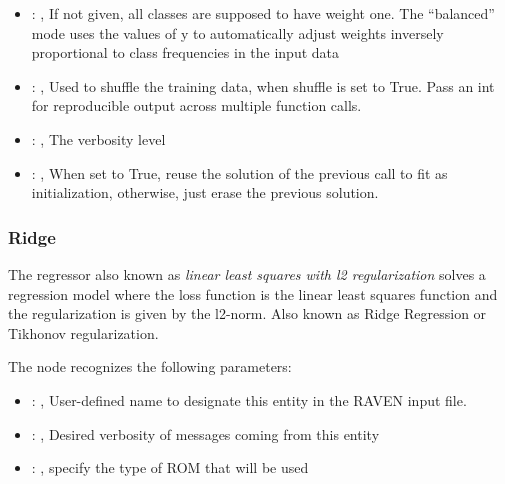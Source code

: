 \begin{itemize}
    \item {}: \xmlDesc{[balanced]}, 
      If not given, all classes are supposed to have weight one.
      The “balanced” mode uses the values of y to automatically adjust weights
      inversely proportional to class frequencies in the input data

    \item {}: , 
      Used to shuffle the training data, when shuffle is set to
      True. Pass an int for reproducible output across multiple function calls.

    \item {}: , 
      The verbosity level

    \item {}: , 
      When set to True, reuse the solution of the previous call
      to fit as initialization, otherwise, just erase the previous solution.
  \end{itemize}


\subsubsection{Ridge}
  The  regressor also known as                              \textit{linear least
  squares with l2 regularization} solves a regression                              model where the
  loss function is the linear least squares function and the
  regularization is given by the l2-norm.                              Also known as Ridge
  Regression or Tikhonov regularization.

  The  node recognizes the following parameters:
    \begin{itemize}
      \item {}: , 
        User-defined name to designate this entity in the RAVEN input file.
      \item {}: , 
        Desired verbosity of messages coming from this entity
      \item {}: , 
        specify the type of ROM that will be used
  \end{itemize}

